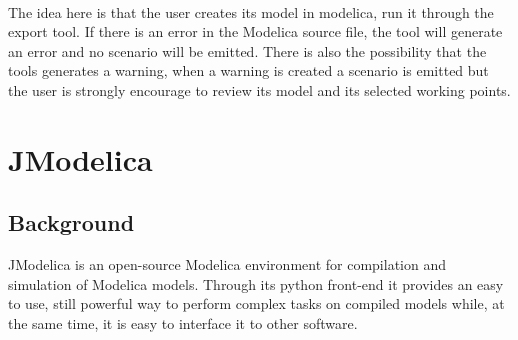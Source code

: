 \documentclass{report}
\begin{document}
\setlength\fboxsep{0pt}
\setlength\fboxrule{0.5pt}
\\\newline

The idea here is that the user creates its model in modelica, run it through the export tool. If there is an error in the Modelica source file, the tool will generate an error and no scenario will be emitted. There is also the possibility that the tools generates a warning, when a warning is created a scenario is emitted but the user is strongly encourage to review its model and its selected working points.\\\newline
\section{JModelica}
\subsection{Background}
JModelica is an open-source Modelica environment  for compilation and simulation of Modelica models. Through its python front-end it provides an easy to use, still powerful way to perform complex tasks on compiled models while, at the same time, it is easy to interface it to other software. 
\end{document}
